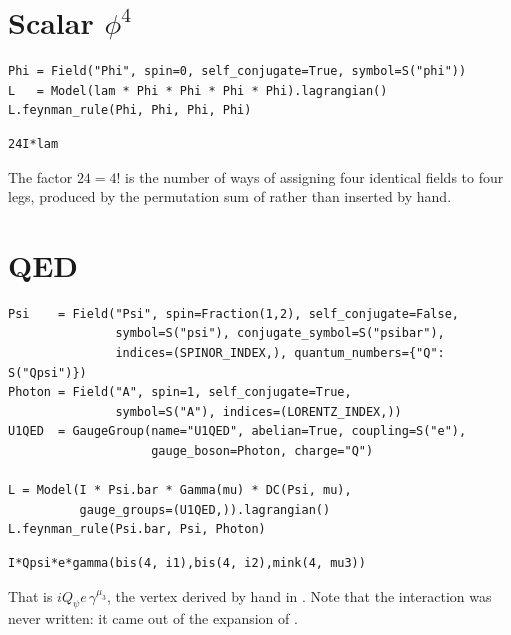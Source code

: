 \section{Scalar \texorpdfstring{$\phi^4$}{phi\string^4}}

\begin{verbatim}
Phi = Field("Phi", spin=0, self_conjugate=True, symbol=S("phi"))
L   = Model(lam * Phi * Phi * Phi * Phi).lagrangian()
L.feynman_rule(Phi, Phi, Phi, Phi)
\end{verbatim}

\begin{verbatim}
24I*lam
\end{verbatim}

\noindent The factor $24 = 4!$ is the number of ways of assigning four
identical fields to four legs, produced by the permutation sum of
 rather than inserted by hand.

\section{QED}

\begin{verbatim}
Psi    = Field("Psi", spin=Fraction(1,2), self_conjugate=False,
               symbol=S("psi"), conjugate_symbol=S("psibar"),
               indices=(SPINOR_INDEX,), quantum_numbers={"Q": S("Qpsi")})
Photon = Field("A", spin=1, self_conjugate=True,
               symbol=S("A"), indices=(LORENTZ_INDEX,))
U1QED  = GaugeGroup(name="U1QED", abelian=True, coupling=S("e"),
                    gauge_boson=Photon, charge="Q")

L = Model(I * Psi.bar * Gamma(mu) * DC(Psi, mu),
          gauge_groups=(U1QED,)).lagrangian()
L.feynman_rule(Psi.bar, Psi, Photon)
\end{verbatim}

\begin{verbatim}
I*Qpsi*e*gamma(bis(4, i1),bis(4, i2),mink(4, mu3))
\end{verbatim}

\noindent That is $i Q_\psi e\, \gamma^{\mu_3}$, the vertex derived by hand
in . Note that the interaction was never
written: it came out of the expansion of .

